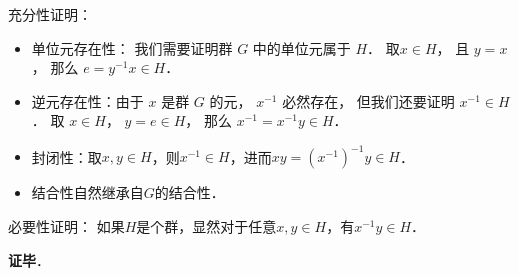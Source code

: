 充分性证明：
\begin{itemize}
\item 单位元存在性： 我们需要证明群 $G$ 中的单位元属于 $H$． 取$x\in H$， 且 $y = x$， 那么 $e = y^{-1}x \in H$．

\item 逆元存在性：由于 $x$ 是群 $G$ 的元， $x^{-1}$ 必然存在， 但我们还要证明 $x^{-1} \in H$． 取 $x \in H$， $y = e \in H$， 那么 $x^{-1} = x^{-1}y \in H$．

\item 封闭性：取$x, y\in H$，则$x^{-1}\in H$，进而$xy=(x^{-1})^{-1}y\in H$．

\item 结合性自然继承自$G$的结合性．
\end{itemize}

必要性证明： 如果$H$是个群，显然对于任意$x, y\in H$，有$x^{-1}y\in H$．

\textbf{证毕}．
